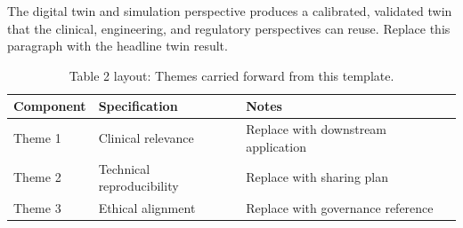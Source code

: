 
The digital twin and simulation perspective produces a calibrated, validated twin that the clinical, engineering, and regulatory perspectives can reuse. Replace this paragraph with the headline twin result.

\begin{table}[H]
\caption{Table 2 layout: Themes carried forward from this template.}
\label{tab:conclusions_themes}
\centering
\begin{tabular}{>{\raggedright\arraybackslash}p{3.4cm} >{\raggedright\arraybackslash}p{4.6cm} >{\raggedright\arraybackslash}p{5.4cm}}
\toprule
\textbf{Component} & \textbf{Specification} & \textbf{Notes} \\
\midrule
  Theme 1 & Clinical relevance & Replace with downstream application \\
  Theme 2 & Technical reproducibility & Replace with sharing plan \\
  Theme 3 & Ethical alignment & Replace with governance reference \\
\bottomrule
\end{tabular}
\end{table}
